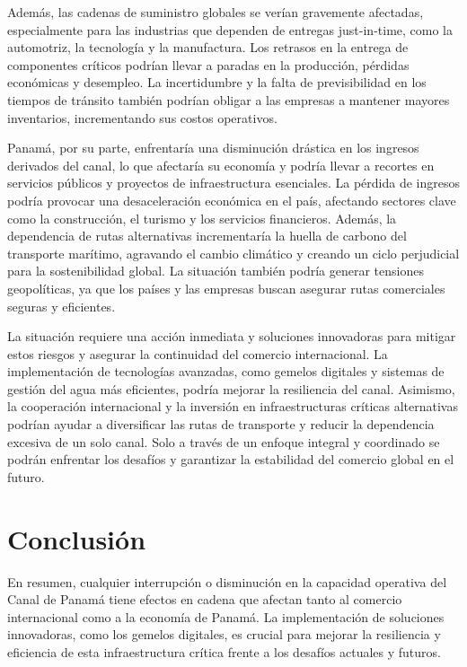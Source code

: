 \documentclass{article}
\begin{document}
Además, las cadenas de suministro globales se verían gravemente
afectadas, especialmente para las industrias que dependen de entregas
just-in-time, como la automotriz, la tecnología y la manufactura. Los
retrasos en la entrega de componentes críticos podrían llevar a paradas
en la producción, pérdidas económicas y desempleo. La incertidumbre y la
falta de previsibilidad en los tiempos de tránsito también podrían
obligar a las empresas a mantener mayores inventarios, incrementando sus
costos operativos.

Panamá, por su parte, enfrentaría una disminución drástica en los
ingresos derivados del canal, lo que afectaría su economía y podría
llevar a recortes en servicios públicos y proyectos de infraestructura
esenciales. La pérdida de ingresos podría provocar una desaceleración
económica en el país, afectando sectores clave como la construcción, el
turismo y los servicios financieros. Además, la dependencia de rutas
alternativas incrementaría la huella de carbono del transporte marítimo,
agravando el cambio climático y creando un ciclo perjudicial para la
sostenibilidad global. La situación también podría generar tensiones
geopolíticas, ya que los países y las empresas buscan asegurar rutas
comerciales seguras y eficientes.

La situación requiere una acción inmediata y soluciones innovadoras para
mitigar estos riesgos y asegurar la continuidad del comercio
internacional. La implementación de tecnologías avanzadas, como gemelos
digitales y sistemas de gestión del agua más eficientes, podría mejorar
la resiliencia del canal. Asimismo, la cooperación internacional y la
inversión en infraestructuras críticas alternativas podrían ayudar a
diversificar las rutas de transporte y reducir la dependencia excesiva
de un solo canal. Solo a través de un enfoque integral y coordinado se
podrán enfrentar los desafíos y garantizar la estabilidad del comercio
global en el futuro.

\hypertarget{conclusiuxf3n}{%
\section{Conclusión}\label{conclusiuxf3n}}

En resumen, cualquier interrupción o disminución en la capacidad
operativa del Canal de Panamá tiene efectos en cadena que afectan tanto
al comercio internacional como a la economía de Panamá. La
implementación de soluciones innovadoras, como los gemelos digitales, es
crucial para mejorar la resiliencia y eficiencia de esta infraestructura
crítica frente a los desafíos actuales y futuros.
\end{document}
